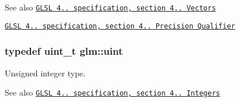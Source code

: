 \begin{DoxySeeAlso}{\-See also}
\href{http://www.opengl.org/registry/doc/GLSLangSpec.4.20.8.pdf}{\tt \-G\-L\-S\-L 4.. specification, section 4.. \-Vectors} 

\href{http://www.opengl.org/registry/doc/GLSLangSpec.4.20.8.pdf}{\tt \-G\-L\-S\-L 4.. specification, section 4.. \-Precision \-Qualifier} 
\end{DoxySeeAlso}
\hypertarget{group__core__precision_ga483f6011e60602f0b73bfd0acad0f04c}{
\subsubsection[{uint}]{\setlength{\rightskip}{0pt plus 5cm}typedef uint\-\_\-t {\bf glm\-::uint}}}\label{group__core__precision_ga483f6011e60602f0b73bfd0acad0f04c}
\-Unsigned integer type.

\begin{DoxySeeAlso}{\-See also}
\href{http://www.opengl.org/registry/doc/GLSLangSpec.4.20.8.pdf}{\tt \-G\-L\-S\-L 4.. specification, section 4.. \-Integers} 
\end{DoxySeeAlso}
